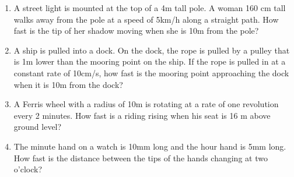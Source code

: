 \begin{enumerate}
\begin{itemize}
\end{itemize} 

\item 
A street light is mounted at the top of a 4m tall pole. A woman 160 cm tall walks away from the pole at a speed of 5km/h along a straight path. How fast is the tip of her shadow moving when she is 10m from the pole?


\item 
A ship is pulled into a dock. On the dock, the rope is pulled by a pulley that is 1m lower than the mooring point on the ship. If the rope is pulled in at a constant rate of 10cm/s, how fast is the mooring point approaching the dock when it is 10m from the dock?

\item 
A Ferris wheel with a radius of 10m is rotating at a rate of one revolution every 2 minutes. How fast is a riding rising when his seat is 16 m above ground level?

\item \label{problemRelatedRatesWatchHands}
The minute hand on a watch is 10mm long and the hour hand is 5mm long. How fast is the distance between the tips of the hands changing at two o'clock?

\end{enumerate}


